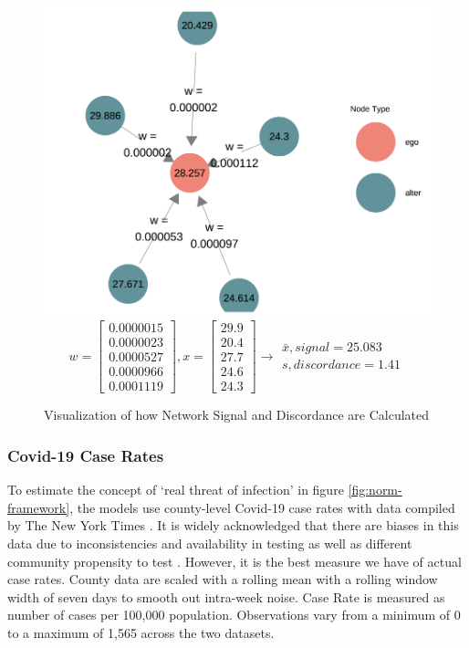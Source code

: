 \begin{figure}
\begin{center}\includegraphics[width=0.5\linewidth,]{figs/paper3/discordancenetwork-1} 
  \begin{equation}
    w = \begin{bmatrix}0.0000015\\0.0000023\\0.0000527\\0.0000966\\0.0001119\end{bmatrix},  
    x = \begin{bmatrix}29.9\\20.4\\27.7\\24.6\\24.3\end{bmatrix} \longrightarrow
    \begin{matrix} \bar{x}, signal = 25.083\\ s, discordance = 1.41 \end{matrix} 
  \end{equation}
  \caption{Visualization of how Network Signal and Discordance are Calculated}
  \label{fig:discordancenetwork}
  \end{center}
\end{figure}

\hypertarget{covid-19-case-rates}{%
\subsubsection{Covid-19 Case Rates}\label{covid-19-case-rates}}

To estimate the concept of `real threat of infection' in figure
\ref{fig:norm-framework}, the models use county-level Covid-19 case rates with
data compiled by The New York Times \citeyearpar{covid_data}. It is widely acknowledged that there are biases in this data due to inconsistencies and availability in testing as well as
different community propensity to test \citep{gu22, cdc20a}. However, it is the best
measure we have of actual case rates. County data are scaled with a rolling mean
with a rolling window width of seven days to smooth out intra-week noise. Case
Rate is measured as number of cases per 100,000 population. Observations vary
from a minimum of 0 to a maximum of 1,565 across the two datasets.

